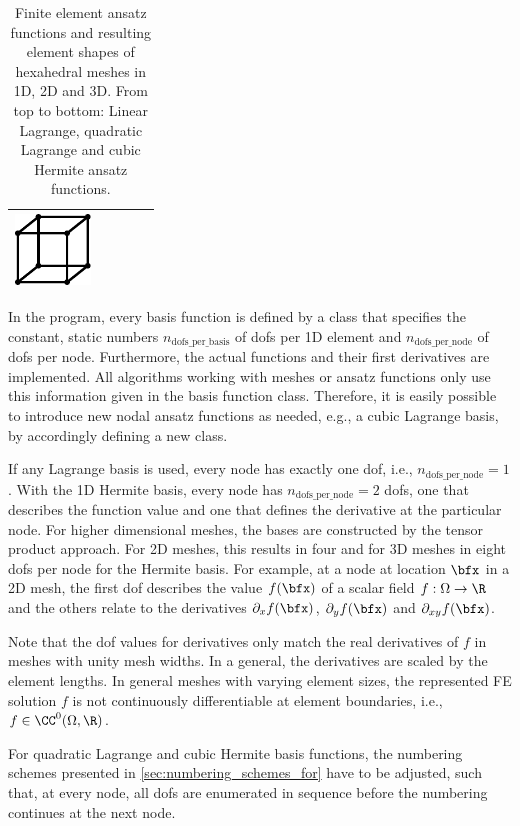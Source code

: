 \begin{table}
\begin{tabular}{|ll|lll|}
      \includegraphics[width=2cm]{images/implementation/ansatz_mesh_3.pdf} \vspace{2mm}\\
    \hline
  \end{tabular}
  \caption{Finite element ansatz functions and resulting element shapes of hexahedral meshes in 1D, 2D and 3D. From top to bottom: Linear Lagrange, quadratic Lagrange and cubic Hermite ansatz functions.}%
  \label{tab:ansatz_functions_mesh}%
\end{table}

In the program, every basis function is defined by a class that specifies the constant, static numbers $n_\text{dofs\_per\_basis}$ of dofs per 1D element and $n_\text{dofs\_per\_node}$ of dofs per node. Furthermore, the actual functions and their first derivatives are implemented. 
All algorithms working with meshes or ansatz functions only use this information given in the basis function class. Therefore, it is easily possible to introduce new nodal ansatz functions as needed, e.g., a cubic Lagrange basis, by accordingly defining a new class.

If any Lagrange basis is used, every node has exactly one dof, i.e., $n_\text{dofs\_per\_node}=1$. With the 1D Hermite basis, every node has $n_\text{dofs\_per\_node}=2$ dofs, one that describes the function value and one that defines the derivative at the particular node. For higher dimensional meshes, the bases are constructed by the tensor product approach. For 2D meshes, this results in four and for 3D meshes in eight dofs per node for the Hermite basis. For example, at a node at location $\bfx$ in a 2D mesh, the first dof describes the value $f(\bfx)$ of a scalar field $f:\Omega \to \R$ and the others relate to the derivatives $\partial_x f(\bfx)$, $\partial_y f(\bfx)$ and $\partial_{xy} f(\bfx)$. 

Note that the dof values for derivatives only match the real derivatives of $f$ in meshes with unity mesh widths. In a general, the derivatives are scaled by the element lengths. In general meshes with varying element sizes, the represented FE solution $f$ is not continuously differentiable at element boundaries, i.e., $f\in\CC^0(\Omega,\R)$.

For quadratic Lagrange and cubic Hermite basis functions, the numbering schemes presented in \cref{sec:numbering_schemes_for} have to be adjusted, such that, at every node, all dofs are enumerated in sequence before the numbering continues at the next node.

